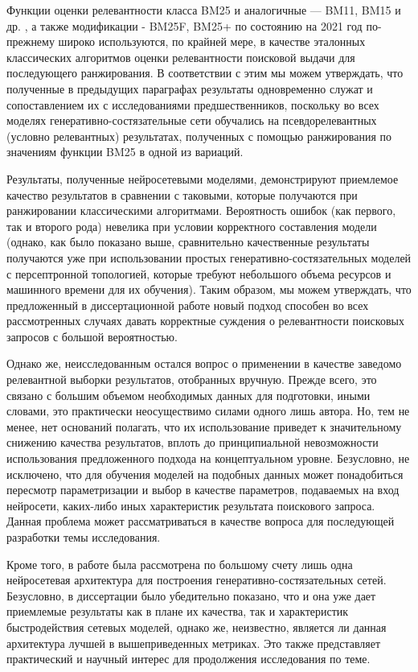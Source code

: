 Функции оценки релевантности класса BM25 \cite{Amati2009} и аналогичные --- BM11, BM15 и др. \cite{bm25xapian}, а также модификации - BM25F, BM25+
\cite{10.1145/2063576.2063584, 10.1561/1500000019, Zaragoza04microsoftcambridge} по состоянию на 2021 год по-прежнему широко используются, по
крайней мере, в качестве эталонных классических алгоритмов оценки релевантности поисковой выдачи для последующего ранжирования. В соответствии
с этим мы можем утверждать, что полученные в предыдущих параграфах результаты одновременно служат и сопоставлением их с исследованиями 
предшественников, поскольку во всех моделях генеративно-состязательные сети обучались на псевдорелевантных (условно релевантных) результатах,
полученных с помощью ранжирования по значениям функции BM25 в одной из вариаций.

Результаты, полученные нейросетевыми моделями, демонстрируют приемлемое качество результатов в сравнении с таковыми, которые получаются при
ранжировании классическими алгоритмами. Вероятность ошибок (как первого, так и второго рода) невелика при условии корректного составления модели
(однако, как было показано выше, сравнительно качественные результаты получаются уже при использовании простых генеративно-состязательных
моделей с персептронной топологией, которые требуют небольшого объема ресурсов и машинного времени для их обучения). Таким образом, мы можем 
утверждать, что предложенный в диссертационной работе новый подход способен во всех рассмотренных случаях давать корректные суждения о релевантности
поисковых запросов с большой вероятностью.

Однако же, неисследованным остался вопрос о применении в качестве заведомо релевантной выборки результатов, отобранных вручную. Прежде всего,
это связано с большим объемом необходимых данных для подготовки, иными словами, это практически неосуществимо силами одного лишь автора.
Но, тем не менее, нет оснований полагать, что их использование приведет к значительному снижению качества результатов, вплоть до принципиальной
невозможности использования предложенного подхода на концептуальном уровне. Безусловно, не исключено, что для обучения моделей на подобных данных 
может понадобиться пересмотр параметризации и выбор в качестве параметров, подаваемых на вход нейросети, каких-либо иных характеристик результата
поискового запроса. Данная проблема может рассматриваться в качестве вопроса для последующей разработки темы исследования.

Кроме того, в работе была рассмотрена по большому счету лишь одна нейросетевая архитектура для построения генеративно-состязательных сетей.
Безусловно, в диссертации было убедительно показано, что и она уже дает приемлемые результаты как в плане их качества, так и характеристик
быстродействия сетевых моделей, однако же, неизвестно, является ли данная архитектура лучшей в вышеприведенных метриках. Это также представляет
практический и научный интерес для продолжения исследования по теме.